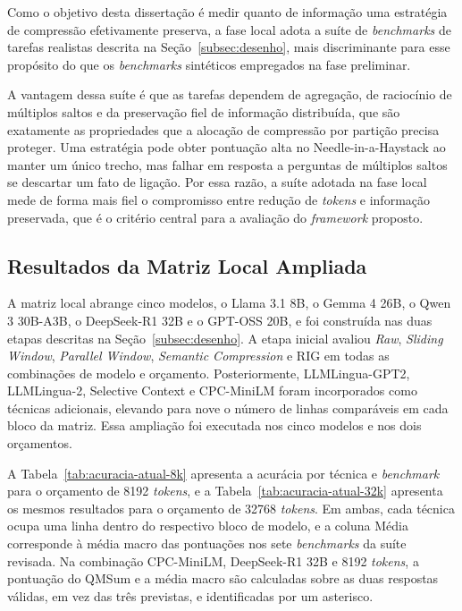 Como o objetivo desta dissertação é medir quanto de informação uma estratégia de compressão efetivamente preserva, a fase local adota a suíte de \textit{benchmarks} de tarefas realistas descrita na Seção~\ref{subsec:desenho}, mais discriminante para esse propósito do que os \textit{benchmarks} sintéticos empregados na fase preliminar.

A vantagem dessa suíte é que as tarefas dependem de agregação, de raciocínio de múltiplos saltos e da preservação fiel de informação distribuída, que são exatamente as propriedades que a alocação de compressão por partição precisa proteger. Uma estratégia pode obter pontuação alta no Needle-in-a-Haystack ao manter um único trecho, mas falhar em resposta a perguntas de múltiplos saltos se descartar um fato de ligação. Por essa razão, a suíte adotada na fase local mede de forma mais fiel o compromisso entre redução de \textit{tokens} e informação preservada, que é o critério central para a avaliação do \textit{framework} proposto.

\subsection{Resultados da Matriz Local Ampliada}
\label{subsec:resultados}

A matriz local abrange cinco modelos, o Llama 3.1 8B, o Gemma 4 26B, o Qwen 3 30B-A3B, o DeepSeek-R1 32B e o GPT-OSS 20B, e foi construída nas duas etapas descritas na Seção~\ref{subsec:desenho}. A etapa inicial avaliou \textit{Raw}, \textit{Sliding Window}, \textit{Parallel Window}, \textit{Semantic Compression} e RIG em todas as combinações de modelo e orçamento. Posteriormente, LLMLingua-GPT2, LLMLingua-2, Selective Context e CPC-MiniLM foram incorporados como técnicas adicionais, elevando para nove o número de linhas comparáveis em cada bloco da matriz. Essa ampliação foi executada nos cinco modelos e nos dois orçamentos.

A Tabela~\ref{tab:acuracia-atual-8k} apresenta a acurácia por técnica e \textit{benchmark} para o orçamento de 8192 \textit{tokens}, e a Tabela~\ref{tab:acuracia-atual-32k} apresenta os mesmos resultados para o orçamento de 32768 \textit{tokens}. Em ambas, cada técnica ocupa uma linha dentro do respectivo bloco de modelo, e a coluna Média corresponde à média macro das pontuações nos sete \textit{benchmarks} da suíte revisada. Na combinação CPC-MiniLM, DeepSeek-R1 32B e 8192 \textit{tokens}, a pontuação do QMSum e a média macro são calculadas sobre as duas respostas válidas, em vez das três previstas, e identificadas por um asterisco.

